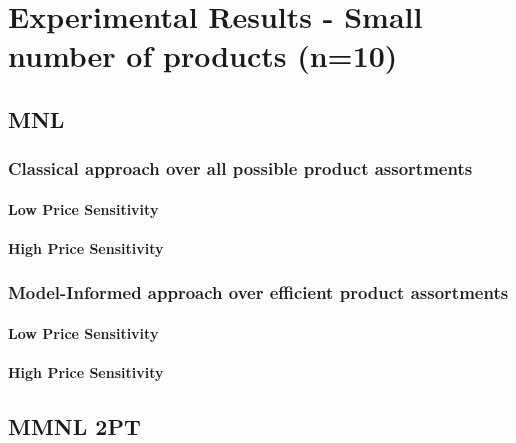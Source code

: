 \section{Experimental Results - Small number of products (n=10)}

\subsection{MNL}

\subsubsection{Classical approach over all possible product assortments}

\paragraph{Low Price Sensitivity}



\paragraph{High Price Sensitivity}



\subsubsection{Model-Informed approach over efficient product assortments}

\paragraph{Low Price Sensitivity}



\paragraph{High Price Sensitivity}



\subsection{MMNL 2PT}

